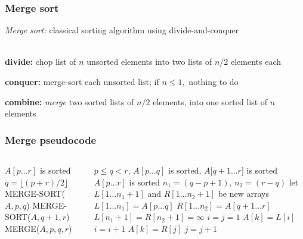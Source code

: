 \documentclass{beamer}
\newcommand{\stanza}{ \\~\ }
\begin{document}
\begin{frame} \frametitle{Merge sort}
  \emph{Merge sort:} classical sorting algorithm using divide-and-conquer \stanza

  \textbf{divide:} chop list of $n$ unsorted elements into two lists of $n/2$
    elements each

  \textbf{conquer:} merge-sort each unsorted list; if $n \leq 1,$ nothing to do

  \textbf{combine:} \emph{merge} two sorted lists of $n/2$ elements, into one
    sorted list of $n$ elements

\end{frame}

\begin{frame} \frametitle{Merge pseudocode}

  \begin{columns}
  \begin{column}{0.4\textwidth}
    {\tiny
      \begin{algorithmic}[1]
        \Ensure $A[p \ldots r]$ is sorted
          \State $q = \lfloor (p+r) / 2 \rfloor$
          \State MERGE-SORT($A, p, q$)
          \State MERGE-SORT($A, q+1, r$)
          \State MERGE($A, p, q, r$)
        \EndIf
        \EndFunction
      \end{algorithmic}
    }
\end{column}
\begin{column}{0.6\textwidth}

    {\tiny
    \begin{algorithmic}[1]
      \Require $p \leq q < r$, $A[p \ldots q]$ is sorted, $A[q+1 \ldots r$] is sorted
      \Ensure $A[p \ldots r]$ is sorted
      \State $n_1 = (q-p+1), \, n_2 = (r-q)$
      \State let $L[1 \ldots n_1+1]$ and $R[1 \ldots n_2 + 1]$ be new arrays
      \State $L[1 \ldots n_1] = A[p \ldots q]$
      \State $R[1 \ldots n_2] = A[q+1 \ldots r]$
      \State $L[n_1+1] = R[n_2+1] = \infty$
      \State $i = j = 1$
              \State $A[k] = L[i]$
              \State $i = i + 1$
          \Else
              \State $A[k] = R[j]$
              \State $j = j + 1$
          \EndIf
      \EndFor
      \EndFunction
    \end{algorithmic}
    }

\end{column}
\end{columns}
\end{frame}
\end{document}
